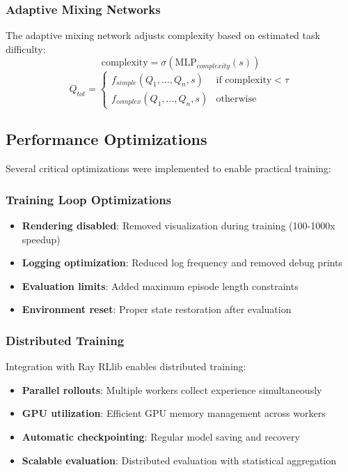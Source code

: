 \documentclass[conference]{IEEEtran}
\begin{document}
\subsubsection{Adaptive Mixing Networks}
The adaptive mixing network adjusts complexity based on estimated task difficulty:
$$\text{complexity} = \sigma(\text{MLP}_{complexity}(s))$$
$$Q_{tot} = \begin{cases}
f_{simple}(Q_1, ..., Q_n, s) & \text{if complexity} < \tau \\
f_{complex}(Q_1, ..., Q_n, s) & \text{otherwise}
\end{cases}$$

\subsection{Performance Optimizations}

Several critical optimizations were implemented to enable practical training:

\subsubsection{Training Loop Optimizations}
\begin{itemize}
\item \textbf{Rendering disabled}: Removed visualization during training (100-1000x speedup)
\item \textbf{Logging optimization}: Reduced log frequency and removed debug prints
\item \textbf{Evaluation limits}: Added maximum episode length constraints
\item \textbf{Environment reset}: Proper state restoration after evaluation
\end{itemize}

\subsubsection{Distributed Training}
Integration with Ray RLlib enables distributed training:
\begin{itemize}
\item \textbf{Parallel rollouts}: Multiple workers collect experience simultaneously
\item \textbf{GPU utilization}: Efficient GPU memory management across workers
\item \textbf{Automatic checkpointing}: Regular model saving and recovery
\item \textbf{Scalable evaluation}: Distributed evaluation with statistical aggregation
\end{itemize}
\end{document}
